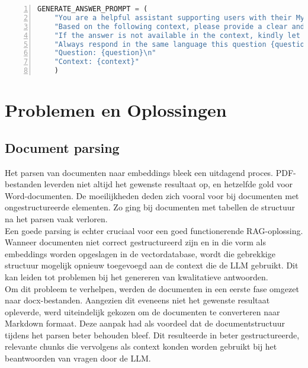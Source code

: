 \begin{lstlisting}[basicstyle=\small, frame=single, breaklines=true, postbreak=\mbox{\textcolor{red}{$\hookrightarrow$}\space}, escapeinside ={\%,}, escapechar={!}, numbers=left, language=Python, caption=Beoordeling documenten prompt]
GENERATE_ANSWER_PROMPT = (
    "You are a helpful assistant supporting users with their MyMinfin IT-related questions.\n"
    "Based on the following context, please provide a clear and complete answer.\n"
    "If the answer is not available in the context, kindly let the user know that you don't have enough information.\n"
    "Always respond in the same language this question {question} is asked, even if the context is in a different language.\n\n"
    "Question: {question}\n"
    "Context: {context}"
    )
\end{lstlisting}

\section{Problemen en Oplossingen}

\subsection{Document parsing}
Het parsen van documenten naar embeddings bleek een uitdagend proces. PDF-bestanden leverden niet altijd het gewenste resultaat op, en hetzelfde gold voor Word-documenten. De moeilijkheden deden zich vooral voor bij documenten met ongestructureerde elementen. Zo ging bij documenten met tabellen de structuur na het parsen vaak verloren.
\\[1em]
Een goede parsing is echter cruciaal voor een goed functionerende RAG-oplossing. Wanneer documenten niet correct gestructureerd zijn en in die vorm als embeddings worden opgeslagen in de vectordatabase, wordt die gebrekkige structuur mogelijk opnieuw toegevoegd aan de context die de LLM gebruikt. Dit kan leiden tot problemen bij het genereren van kwalitatieve antwoorden.
\\[1em]
Om dit probleem te verhelpen, werden de documenten in een eerste fase omgezet naar docx-bestanden. Aangezien dit eveneens niet het gewenste resultaat opleverde, werd uiteindelijk gekozen om de documenten te converteren naar Markdown formaat. Deze aanpak had als voordeel dat de documentstructuur tijdens het parsen beter behouden bleef. Dit resulteerde in beter gestructureerde, relevante chunks die vervolgens als context konden worden gebruikt bij het beantwoorden van vragen door de LLM.

